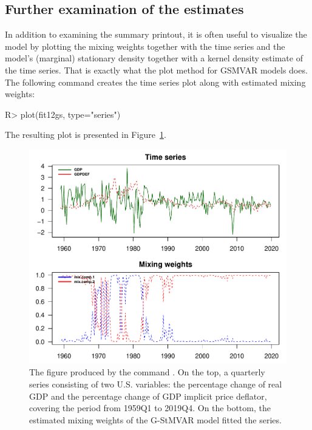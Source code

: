 \documentclass[nojss]{jss}
\begin{document}
\subsection{Further examination of the estimates}\label{sec:examestim}

In addition to examining the summary printout, it is often useful to visualize the model by plotting the mixing weights together with the time series and the model's (marginal) stationary density together with a kernel density estimate of the time series. That is exactly what the plot method for GSMVAR models does. The following command creates the time series plot along with estimated mixing weights:
%
\begin{CodeChunk}
\begin{CodeInput}
R> plot(fit12gs, type="series")
\end{CodeInput}
\end{CodeChunk}
%
The resulting plot is presented in Figure~\ref{fig:seriesplot}.

\begin{figure}[t]
  \centering
  \includegraphics{figures/seriesplot.pdf}
  \caption{The figure produced by the command . On the top, a quarterly series consisting of two U.S. variables: the percentage change of real GDP and the percentage change of GDP implicit price deflator, covering the period from 1959Q1 to 2019Q4. On the bottom, the estimated mixing weights of the G-StMVAR model  fitted the series.}
\label{fig:seriesplot}
\end{figure}
\end{document}
